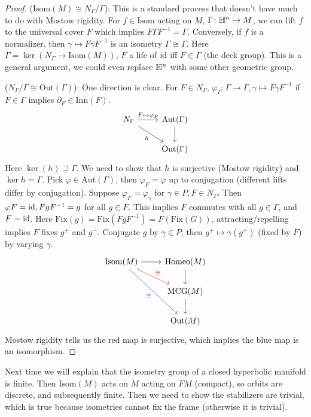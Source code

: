 \begin{proof}
    ($\mathrm{Isom}(M) \cong N_{\Gamma}/\Gamma$): This is a standard process that doesn't have much to do with Mostow rigidity. For $f \in \mathrm{Isom}$ acting on $M$, $\Gamma \colon \mathbb{H}^n  \to M$, we can lift $f$ to the universal cover $F $ which implies $F \Gamma F^{-1} =\Gamma$. Conversely, if $f $ is a normalizer, then $\gamma  \mapsto  F \gamma  F^{-1}$ is an isometry  $\Gamma \cong \Gamma$. Here $\Gamma=\ker(N_{\Gamma}\to  \mathrm{Isom}(M))$, $F$ a life of $\operatorname{id} $ iff $F \in \Gamma$ (the deck group). This is a general argument, we could even replace $\mathbb{H}^n $ with some other geometric group.

    ($N_{\Gamma} / \Gamma \cong \mathrm{Out}(\Gamma)$): One direction is clear. For $F \in N_{\Gamma}$, $\varphi _{\Gamma} \colon \Gamma \to \Gamma, \gamma  \mapsto  F \gamma  F^{-1}$ if $F \in \Gamma$ implies $\partial _F \in \mathrm{Inn}(F)$. 
    \[
    \begin{tikzcd}
    N_{\Gamma} \arrow[r, "F \mapsto \varphi_F"] \arrow[rd, "h"'] & \mathrm{Aut}(\Gamma) \arrow[d] \\
                                                                 & \mathrm{Out}(\Gamma)          
    \end{tikzcd}
    \] 
    Here $\ker(h) \supseteq \Gamma$. We need to show that $h$ is surjective (Mostow rigidity) and $\ker h = \Gamma$. Pick $\varphi  \in  \mathrm{Aut}(\Gamma)$, then $\varphi _F = \varphi $ up to conjugation (different lifts differ by conjugation). Suppose $\varphi _F=\varphi _{\gamma }$ for $\gamma  \in P, F \in N_{\Gamma}$. Then $\varphi F=\operatorname{id}, F g F ^{-1} = g$ for all $g \in F$. This implies $F$ commutes with all $g \in \Gamma$, and $F=\operatorname{id}$. Here $\mathrm{Fix}(g)= \mathrm{Fix}(F g F^{-1})=F( \mathrm{Fix}(G))$, attracting/repelling implies $F $ fixes $g^+$ and $g^-$. Conjugate $g$ by $\gamma  \in P$, then $g^+ \mapsto  \gamma (g^+)$ (fixed by $F$) by varying $\gamma $.
    \[
        \begin{tikzcd}
\mathrm{Isom}(M) \arrow[r] \arrow[rd, "\cong", hook,red] \arrow[rdd,"\cong"', blue] & \mathrm{Homeo}(M) \arrow[d] \\
                                                                 & \mathrm{MCG}(M) \arrow[d]   \\
                                                                 & \mathrm{Out}(M)            
\end{tikzcd}
    \] Mostow rigidity tells us the red map is surjective, which implies the blue map is an isomorphism.
\end{proof}
Next time we will explain that the isometry group of a closed hyperbolic manifold is finite. Then $\mathrm{Isom}(M)$ acts on $M$ acting on $FM$ (compact), so orbits are discrete, and subsequently finite. Then we need to show the stabilizers are trivial, which is true because isometries cannot fix the frame (otherwise it is trivial).


